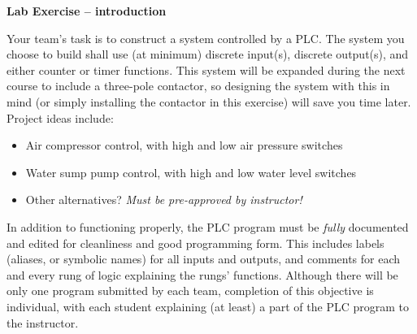 

\noindent
{\bf Lab Exercise -- introduction}

\vskip 5pt

Your team's task is to construct a system controlled by a PLC.  The system you choose to build shall use (at minimum) discrete input(s), discrete output(s), and either counter or timer functions.  This system will be expanded during the next course to include a three-pole contactor, so designing the system with this in mind (or simply installing the contactor in this exercise) will save you time later.  Project ideas include:

\begin{itemize}
\item{} Air compressor control, with high and low air pressure switches
\vskip 5pt
\item{} Water sump pump control, with high and low water level switches
\vskip 5pt
\item{} Other alternatives? {\it Must be pre-approved by instructor!}
\end{itemize}

In addition to functioning properly, the PLC program must be {\it fully} documented and edited for cleanliness and good programming form.  This includes labels (aliases, or symbolic names) for all inputs and outputs, and comments for each and every rung of logic explaining the rungs' functions.  Although there will be only one program submitted by each team, completion of this objective is individual, with each student explaining (at least) a part of the PLC program to the instructor.

\vskip 10pt



